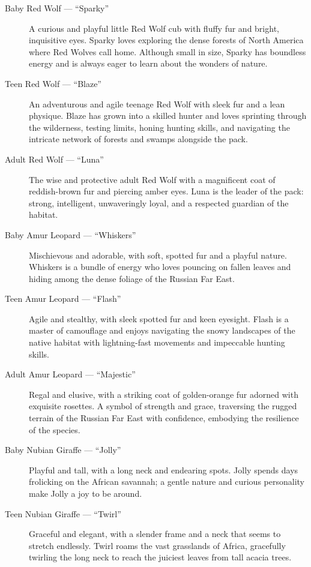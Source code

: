 \begin{description}
  \item[Baby Red Wolf --- ``Sparky''] A curious and playful little Red Wolf cub with fluffy fur and bright, inquisitive eyes. Sparky loves exploring the dense forests of North America where Red Wolves call home. Although small in size, Sparky has boundless energy and is always eager to learn about the wonders of nature.

  \item[Teen Red Wolf --- ``Blaze''] An adventurous and agile teenage Red Wolf with sleek fur and a lean physique. Blaze has grown into a skilled hunter and loves sprinting through the wilderness, testing limits, honing hunting skills, and navigating the intricate network of forests and swamps alongside the pack.

  \item[Adult Red Wolf --- ``Luna''] The wise and protective adult Red Wolf with a magnificent coat of reddish-brown fur and piercing amber eyes. Luna is the leader of the pack: strong, intelligent, unwaveringly loyal, and a respected guardian of the habitat.

  \item[Baby Amur Leopard --- ``Whiskers''] Mischievous and adorable, with soft, spotted fur and a playful nature. Whiskers is a bundle of energy who loves pouncing on fallen leaves and hiding among the dense foliage of the Russian Far East.

  \item[Teen Amur Leopard --- ``Flash''] Agile and stealthy, with sleek spotted fur and keen eyesight. Flash is a master of camouflage and enjoys navigating the snowy landscapes of the native habitat with lightning-fast movements and impeccable hunting skills.

  \item[Adult Amur Leopard --- ``Majestic''] Regal and elusive, with a striking coat of golden-orange fur adorned with exquisite rosettes. A symbol of strength and grace, traversing the rugged terrain of the Russian Far East with confidence, embodying the resilience of the species.

  \item[Baby Nubian Giraffe --- ``Jolly''] Playful and tall, with a long neck and endearing spots. Jolly spends days frolicking on the African savannah; a gentle nature and curious personality make Jolly a joy to be around.

  \item[Teen Nubian Giraffe --- ``Twirl''] Graceful and elegant, with a slender frame and a neck that seems to stretch endlessly. Twirl roams the vast grasslands of Africa, gracefully twirling the long neck to reach the juiciest leaves from tall acacia trees.


\end{description}

